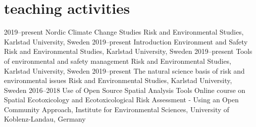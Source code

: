 \documentclass[]{friggeri-cv} %
\begin{document}
\section{teaching activities}

\begin{entrylist}
\entry
{\small{2019--present}}
{Nordic Climate Change Studies}
{}
{Risk and Environmental Studies, Karlstad University, Sweden}
\entry
{\small{2019--present}}
{Introduction Environment and Safety}
{}
{Risk and Environmental Studies, Karlstad University, Sweden}
\entry
{\small{2019--present}}
{Tools of environmental and safety management}
{}
{Risk and Environmental Studies, Karlstad University, Sweden}
\entry
{\small{2019--present}}
{The natural science basis of risk and environmental issues}
{}
{Risk and Environmental Studies, Karlstad University, Sweden}
\entry
{\small{2016--2018}}
{Use of Open Source Spatial Analysis Tools}
{}
{Online course on Spatial Ecotoxicology and Ecotoxicological Risk Assessment - Using an Open Community Approach, Institute for Environmental Sciences, University of Koblenz-Landau, Germany}
\end{entrylist}
\end{document}
